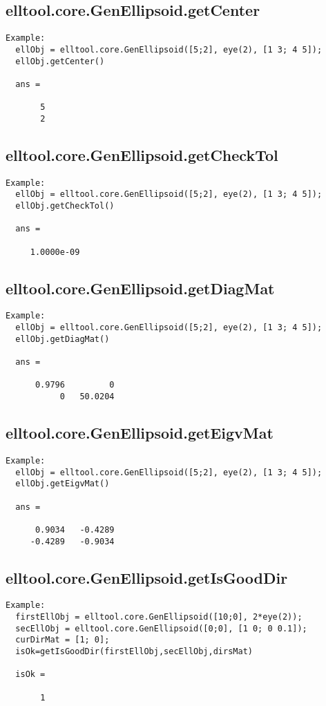 \subsection{\texorpdfstring{elltool.core.GenEllipsoid.getCenter}{getCenter}}\label{method:elltool.core.GenEllipsoid.getCenter}
\begin{verbatim}
Example:
  ellObj = elltool.core.GenEllipsoid([5;2], eye(2), [1 3; 4 5]);
  ellObj.getCenter()

  ans =

       5
       2
\end{verbatim}
\subsection{\texorpdfstring{elltool.core.GenEllipsoid.getCheckTol}{getCheckTol}}\label{method:elltool.core.GenEllipsoid.getCheckTol}
\begin{verbatim}
Example:
  ellObj = elltool.core.GenEllipsoid([5;2], eye(2), [1 3; 4 5]);
  ellObj.getCheckTol()

  ans =

     1.0000e-09
\end{verbatim}
\subsection{\texorpdfstring{elltool.core.GenEllipsoid.getDiagMat}{getDiagMat}}\label{method:elltool.core.GenEllipsoid.getDiagMat}
\begin{verbatim}
Example:
  ellObj = elltool.core.GenEllipsoid([5;2], eye(2), [1 3; 4 5]);
  ellObj.getDiagMat()

  ans =

      0.9796         0
           0   50.0204
\end{verbatim}
\subsection{\texorpdfstring{elltool.core.GenEllipsoid.getEigvMat}{getEigvMat}}\label{method:elltool.core.GenEllipsoid.getEigvMat}
\begin{verbatim}
Example:
  ellObj = elltool.core.GenEllipsoid([5;2], eye(2), [1 3; 4 5]);
  ellObj.getEigvMat()

  ans =

      0.9034   -0.4289
     -0.4289   -0.9034
\end{verbatim}
\subsection{\texorpdfstring{elltool.core.GenEllipsoid.getIsGoodDir}{getIsGoodDir}}\label{method:elltool.core.GenEllipsoid.getIsGoodDir}
\begin{verbatim}
Example:
  firstEllObj = elltool.core.GenEllipsoid([10;0], 2*eye(2));
  secEllObj = elltool.core.GenEllipsoid([0;0], [1 0; 0 0.1]);
  curDirMat = [1; 0];
  isOk=getIsGoodDir(firstEllObj,secEllObj,dirsMat)

  isOk =

       1
\end{verbatim}
